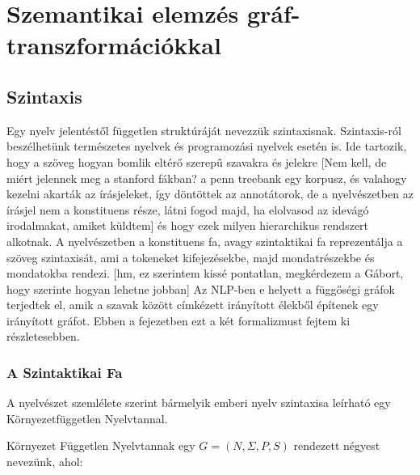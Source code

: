 \chapter{Szemantikai elemzés gráf-transzformációkkal}
\label{sec:SemParsWithGraphTrans}
\section{Szintaxis}
Egy nyelv jelentéstől független struktúráját nevezzük szintaxisnak. Szintaxis-ról beszélhetünk természetes nyelvek és programozási nyelvek esetén is. Ide tartozik, hogy a szöveg hogyan bomlik eltérő szerepű szavakra és jelekre [Nem kell, de miért jelennek meg a stanford fákban? a penn treebank egy korpusz, és valahogy kezelni akarták az írásjeleket, így döntöttek az annotátorok, de a nyelvészetben az írásjel nem a konstituens része, látni fogod majd, ha elolvasod az idevágó irodalmakat, amiket küldtem] és hogy ezek milyen hierarchikus rendszert alkotnak. A nyelvészetben a konstituens fa, avagy szintaktikai fa reprezentálja a szöveg szintaxisát, ami a tokeneket kifejezésekbe, majd mondatrészekbe és mondatokba rendezi. [hm, ez szerintem kissé pontatlan, megkérdezem a Gábort, hogy szerinte hogyan lehetne jobban] Az NLP-ben e helyett a függőségi gráfok terjedtek el, amik a szavak között címkézett irányított élekből építenek egy irányított gráfot. Ebben a fejezetben ezt a két formalizmust fejtem ki részletesebben.

\subsection{A Szintaktikai Fa}
A nyelvészet szemlélete szerint bármelyik emberi nyelv szintaxisa leírható egy Környezetfüggetlen Nyelvtannal.

Környezet Független Nyelvtannak egy $G=(N,\Sigma ,P,S)$ rendezett négyest nevezünk, ahol:

